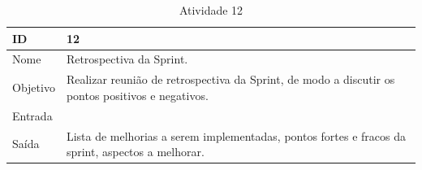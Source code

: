 \begin{table}[\htp]
\centering
\caption{Atividade 12}
\label{my-label}
\begin{tabular}{|l|l|}
\hline
ID       & 12                                           \\ \hline
Nome     & Retrospectiva da Sprint. \\ \hline
Objetivo & Realizar reunião de retrospectiva da Sprint, de modo a discutir os pontos positivos e negativos.
 \\ \hline
Entrada  & \\ \hline
Saída    &  Lista de melhorias a serem implementadas, pontos fortes e fracos da sprint, aspectos a melhorar.\\ \hline
\end{tabular}
\end{table}
